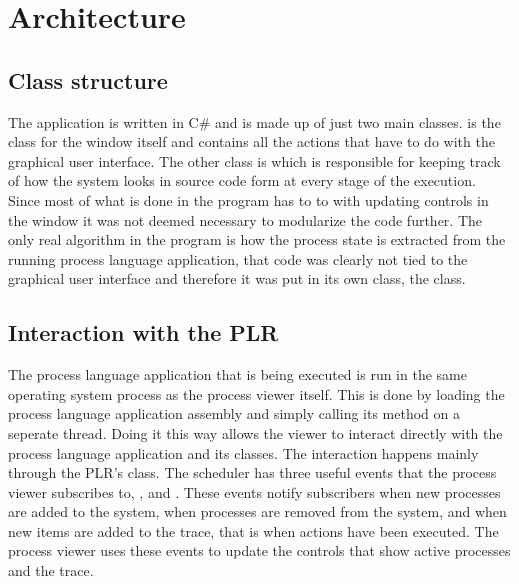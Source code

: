 \section{Architecture}
  
  \subsection{Class structure}
  The application is written in C\# and is made up of just two main classes. 
   is the class for the window itself and contains all
  the actions that have to do with the graphical user interface. The other
  class is  which is responsible for keeping
  track of how the system looks in source code form at every stage of the
  execution. Since most of what is done in the program has to to with updating
  controls in the window it was not deemed necessary to modularize the code
  further. The only real algorithm in the program is how the process state is
  extracted from the running process language application, that code was 
  clearly not tied to the graphical user interface and therefore it was put 
  in its own class, the  class.
  
  \subsection{Interaction with the PLR}
  
  The process language application that is being executed is run in the same 
  operating system process as the process viewer itself. This is done by 
  loading the process language application assembly and simply calling its 
   method on a seperate thread. Doing it this way allows the 
  viewer to interact directly with the process language application and its 
  classes. The interaction happens mainly through the PLR's  
  class. The scheduler has three useful events that the process viewer 
  subscribes to, ,  and 
  . These events notify subscribers when new processes 
  are added to the system, when processes are removed from the system, and 
  when new items are added to the trace, that is when actions have been 
  executed. The process viewer uses these events to update the controls that 
  show active processes and the trace. 
  
